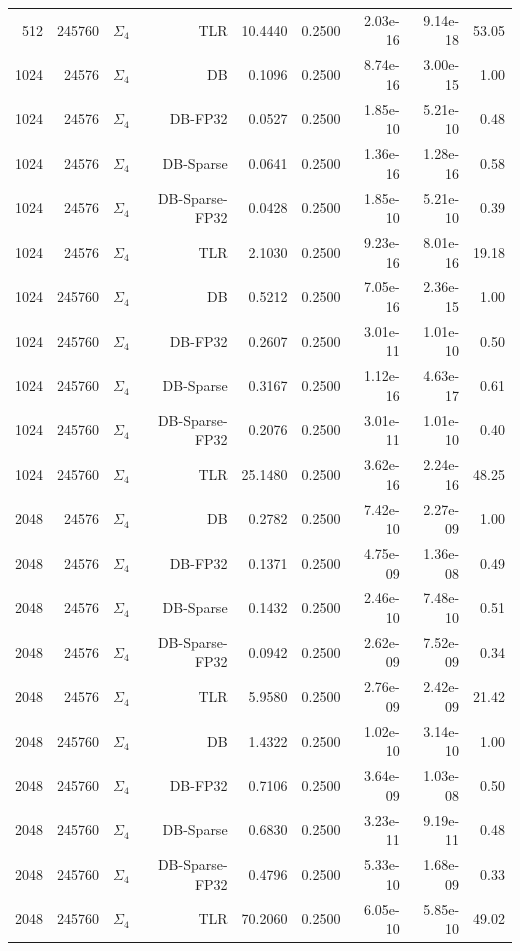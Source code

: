 \begin{tabular}{|r|r|r|r|r|r|r|r|r|}
  512 & 245760 & $\Sigma_4$ & TLR & 10.4440 & 0.2500 & 2.03e-16 & 9.14e-18 & 53.05 \\
  1024 & 24576 & $\Sigma_4$ & DB & 0.1096 & 0.2500 & 8.74e-16 & 3.00e-15 & 1.00 \\
  1024 & 24576 & $\Sigma_4$ & DB-FP32 & 0.0527 & 0.2500 & 1.85e-10 & 5.21e-10 & 0.48 \\
  1024 & 24576 & $\Sigma_4$ & DB-Sparse & 0.0641 & 0.2500 & 1.36e-16 & 1.28e-16 & 0.58 \\
  1024 & 24576 & $\Sigma_4$ & DB-Sparse-FP32 & 0.0428 & 0.2500 & 1.85e-10 & 5.21e-10 & 0.39 \\
  1024 & 24576 & $\Sigma_4$ & TLR & 2.1030 & 0.2500 & 9.23e-16 & 8.01e-16 & 19.18 \\
  1024 & 245760 & $\Sigma_4$ & DB & 0.5212 & 0.2500 & 7.05e-16 & 2.36e-15 & 1.00 \\
  1024 & 245760 & $\Sigma_4$ & DB-FP32 & 0.2607 & 0.2500 & 3.01e-11 & 1.01e-10 & 0.50 \\
  1024 & 245760 & $\Sigma_4$ & DB-Sparse & 0.3167 & 0.2500 & 1.12e-16 & 4.63e-17 & 0.61 \\
  1024 & 245760 & $\Sigma_4$ & DB-Sparse-FP32 & 0.2076 & 0.2500 & 3.01e-11 & 1.01e-10 & 0.40 \\
  1024 & 245760 & $\Sigma_4$ & TLR & 25.1480 & 0.2500 & 3.62e-16 & 2.24e-16 & 48.25 \\
  2048 & 24576 & $\Sigma_4$ & DB & 0.2782 & 0.2500 & 7.42e-10 & 2.27e-09 & 1.00 \\
  2048 & 24576 & $\Sigma_4$ & DB-FP32 & 0.1371 & 0.2500 & 4.75e-09 & 1.36e-08 & 0.49 \\
  2048 & 24576 & $\Sigma_4$ & DB-Sparse & 0.1432 & 0.2500 & 2.46e-10 & 7.48e-10 & 0.51 \\
  2048 & 24576 & $\Sigma_4$ & DB-Sparse-FP32 & 0.0942 & 0.2500 & 2.62e-09 & 7.52e-09 & 0.34 \\
  2048 & 24576 & $\Sigma_4$ & TLR & 5.9580 & 0.2500 & 2.76e-09 & 2.42e-09 & 21.42 \\
  2048 & 245760 & $\Sigma_4$ & DB & 1.4322 & 0.2500 & 1.02e-10 & 3.14e-10 & 1.00 \\
  2048 & 245760 & $\Sigma_4$ & DB-FP32 & 0.7106 & 0.2500 & 3.64e-09 & 1.03e-08 & 0.50 \\
  2048 & 245760 & $\Sigma_4$ & DB-Sparse & 0.6830 & 0.2500 & 3.23e-11 & 9.19e-11 & 0.48 \\
  2048 & 245760 & $\Sigma_4$ & DB-Sparse-FP32 & 0.4796 & 0.2500 & 5.33e-10 & 1.68e-09 & 0.33 \\
  2048 & 245760 & $\Sigma_4$ & TLR & 70.2060 & 0.2500 & 6.05e-10 & 5.85e-10 & 49.02 \\

\end{tabular}
